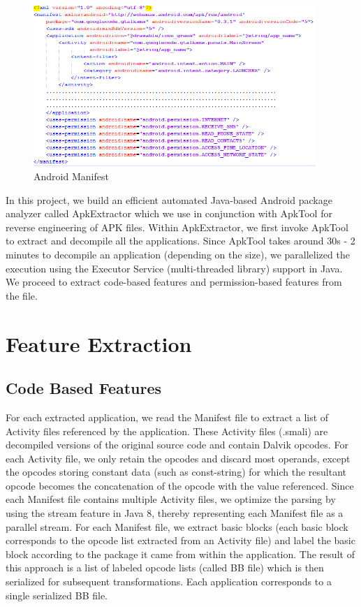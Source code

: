 \begin{figure}[h]
\centering
\includegraphics[height=2.4in, width=\columnwidth]{Manifest.png}
\caption{Android Manifest}
\vskip -6pt
\label{fig:Manifest}
\end{figure}

In this project, we build an efficient automated Java-based Android package analyzer called ApkExtractor which we use in conjunction with ApkTool\cite{ApkTool} for reverse engineering of APK files. Within ApkExtractor, we first invoke ApkTool to extract and decompile all the applications. Since ApkTool takes around 30s - 2 minutes to decompile an application (depending on the size), we parallelized the execution using the Executor Service (multi-threaded library) support in Java. We proceed to extract code-based features and permission-based features from the file.

\section{Feature Extraction}

\subsection{Code Based Features}

For each extracted application, we read the Manifest file to extract a list of Activity files referenced by the application. These Activity files (.smali) are decompiled versions of the original source code and contain Dalvik opcodes. For each Activity file, we only retain the opcodes and discard most operands, except the opcodes storing constant data (such as const-string) for which the resultant opcode becomes the concatenation of the opcode with the value referenced. Since each Manifest file contains multiple Activity files, we optimize the parsing by using the stream feature in Java 8, thereby representing each Manifest file as a parallel stream. For each Manifest file, we extract basic blocks (each basic block corresponds to the opcode list extracted from an Activity file) and label the basic block according to the package it came from within the application. The result of this approach is a list of labeled opcode lists (called BB file) which is then serialized for subsequent transformations. Each application corresponds to a single serialized BB file.

